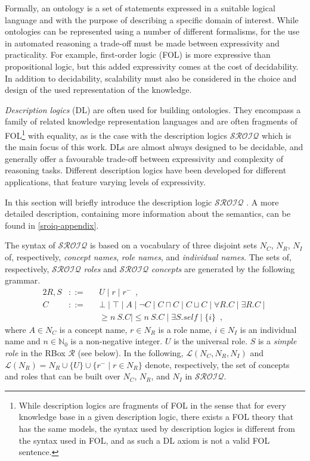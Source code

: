 
Formally, an ontology is a set of statements expressed in a suitable logical language and with the purpose of describing a specific domain of interest. While ontologies can be represented using a number of different formalisms, for the use in automated reasoning a trade-off must be made between expressivity and practicality. For example, first-order logic (FOL) is more expressive than propositional logic, but this added expressivity comes at the cost of decidability. In addition to decidability, scalability must also be considered in the choice and design of the used representation of the knowledge.

\emph{Description logics} (DL) are often used for building ontologies. They encompass a family of related knowledge representation languages and are often fragments of FOL\footnote{While description logics are fragments of FOL in the sense that for every knowledge base in a given description logic, there exists a FOL theory that has the same models, the syntax used by description logics is different from the syntax used in FOL, and as such a DL axiom is not a valid FOL sentence.} with equality, as is the case with the description logics $\mathcal{SROIQ}$ which is the main focus of this work. DLs are almost always designed to be decidable, and generally offer a favourable trade-off between expressivity and complexity of reasoning tasks. Different description logics have been developed for different applications, that feature varying levels of expressivity.

In this section will briefly introduce the description logic $\mathcal{SROIQ}$ \cite{horrocks2006even, rudolph2011foundations, baader_horrocks_lutz_sattler_2017}. A more detailed description, containing more information about the semantics, can be found in \cref{sroiq-appendix}.

The syntax of $\mathcal{SROIQ}$ is based on a vocabulary of three disjoint sets $N_C$, $N_R$, $N_I$ of, respectively, \emph{concept names}, \emph{role names}, and \emph{individual names}. The sets of, respectively, $\mathcal{SROIQ}$ \emph{roles} and $\mathcal{SROIQ}$ \emph{concepts} are generated by the following grammar.
\begin{alignat*}{2}
  R, S &::={} && U \mid r \mid r^{-} \enspace,\\
  C &::= && \bot \mid \top \mid A \mid \neg C \mid C \sqcap C \mid C \sqcup C \mid \forall R.C \mid \exists R.C \mid \\ 
  &&& \geq n~S.C \mid \leq n~S.C \mid \exists S.\mathit{self} \mid \{ i \} \enspace,
\end{alignat*}
\noindent where $A \in N_C$ is a concept name, $r \in N_R$ is a role name, $i \in N_I$ is an individual name and $n \in \mathbb{N}_0$ is a non-negative integer. 
%
$U$ is the universal role. $S$ is a \emph{simple role} in the RBox $\mathcal{R}$ (see below). In the following, $\mathcal{L}(N_C, N_R, N_I)$ and $\mathcal{L}(N_R) = N_R \cup \{U\} \cup \{r^- \mid r \in N_R\}$ denote, respectively, the set of concepts and roles that can be built over $N_C$, $N_R$, and $N_I$ in $\mathcal{SROIQ}$.

